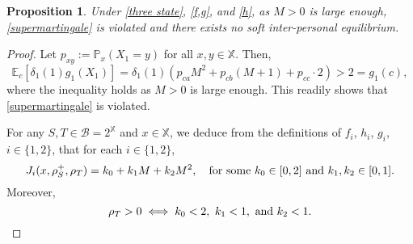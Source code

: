 \documentclass[11pt,reqno]{article}
\numberwithin{equation}{section}
\newtheorem{proposition}{Proposition}[section]
\renewcommand{\P}{\mathbb{P}}
\newcommand{\E}{\mathbb{E}}
\newcommand{\X}{\mathbb{X}}
\newcommand{\B}{\mathcal{B}}
\begin{document}
\begin{proposition}\label{prop:no weak E} 
Under \eqref{three state}, \eqref{f,g}, and \eqref{h}, as $M>0$ is large enough, \eqref{supermartingale} is violated and there exists no soft inter-personal equilibrium.
\end{proposition}

\begin{proof}
Let $p_{xy}:=\P_x(X_1=y)$ for all $x,y\in \X$. Then,
\[
\E_c[\delta_1(1)g_1(X_1)] = \delta_1(1) \left(p_{ca} M^2 + p_{cb} (M+1)+p_{cc}\cdot2\right) > 2 = g_1(c),
\]
where the inequality holds as $M>0$ is large enough. This readily shows that \eqref{supermartingale} is violated.

For any $S,T\in \B=2^\X$ and $x\in\X$, we deduce from the definitions of $f_i$, $h_i$, $g_i$, $i\in\{1,2\}$, that 
for each $i\in\{1,2\}$, 
\begin{equation}\label{J_i expression}
J_i(x,\rho^+_S,\rho_T)= k_0 + k_1 M + k_2 M^2,\quad \hbox{for some}\ k_0\in [0,2]\ \hbox{and}\ k_1, k_2\in [0,1].
\end{equation}
Moreover,
\begin{equation}\label{k_0>0}
\rho_T>0 \iff k_0<2,\ k_1<1,\ \hbox{and}\ k_2<1. 
\end{equation}

\end{proof}
\end{document}
